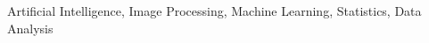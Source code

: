 \begin{cventries}
  \cventry
    {}
    {}
    {}
    {}
    {
    \vspace*{-0.35cm}
      \begin{cvitems}
        \item {Artificial Intelligence, Image Processing, Machine Learning, Statistics, Data Analysis}
      \end{cvitems}
    }
\end{cventries}
